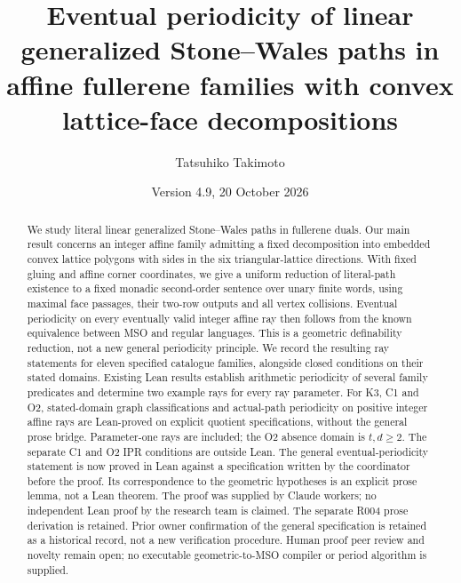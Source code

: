 \documentclass[11pt]{amsart}
\title[Affine fullerene families and eventual periodicity]{Eventual periodicity of linear generalized Stone--Wales paths in affine fullerene families with convex lattice-face decompositions}
\author{Tatsuhiko Takimoto}
\date{Version 4.9, 20 October 2026}
\theoremstyle{definition}\newtheorem{definition}{Definition}
\begin{document}
\begin{abstract}
We study literal linear generalized Stone--Wales paths in fullerene
duals. Our main result concerns an integer affine family admitting a
fixed decomposition into embedded convex lattice polygons with sides
in the six triangular-lattice directions. With fixed gluing and affine
corner coordinates, we give a uniform reduction of literal-path
existence to a fixed monadic second-order sentence over unary finite
words, using maximal face passages, their two-row outputs and all
vertex collisions. Eventual periodicity on every eventually valid
integer affine ray then follows from the known equivalence between
MSO and regular languages. This is a geometric definability reduction,
not a new general periodicity principle. We record
the resulting ray statements for eleven specified catalogue families,
alongside closed conditions on their stated domains. Existing Lean
results establish arithmetic periodicity of several family predicates
and determine two example rays for every ray parameter. For K3, C1 and O2, stated-domain graph classifications and actual-path
periodicity on positive integer affine rays are Lean-proved on explicit
quotient specifications, without the general prose bridge. Parameter-one
rays are included; the O2 absence domain is $t,d\ge2$. The separate
C1 and O2 IPR conditions are outside Lean. The general
eventual-periodicity statement is now proved
in Lean against a specification written by the coordinator before the
proof. Its correspondence to the geometric hypotheses is an explicit
prose lemma, not a Lean theorem. The proof was supplied by Claude
workers; no independent Lean proof by the research team is claimed.
The separate R004 prose derivation is retained. Prior owner confirmation of the general specification is retained as a
historical record, not a new verification procedure. Human proof peer review
and novelty remain open;
no executable geometric-to-MSO compiler or period algorithm is supplied.
\end{abstract}
\maketitle
\end{document}
